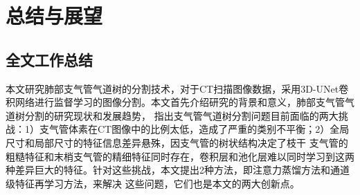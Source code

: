 
\chapter{总结与展望}\label{chap:summary_and_outlook}

\section{全文工作总结}

本文研究肺部支气管气道树的分割技术，对于CT扫描图像数据，采用3D-UNet卷积网络进行监督学习的图像分割。本文首先介绍研究的背景和意义，肺部支气管气道树分割的研究现状和发展趋势，
指出支气管气道树分割问题目前面临的两大挑战：1）支气管体素在CT图像中的比例太低，造成了严重的类别不平衡；2）全局尺寸和局部尺寸的特征信息差异悬殊，因支气管的树状结构决定了枝干
支气管的粗糙特征和末梢支气管的精细特征同时存在，卷积层和池化层难以同时学习到这两种差异巨大的特征。针对这些挑战，本文提出2种方法，即注意力蒸馏方法和通道级特征再学习方法，来解决
这些问题，它们也是本文的两大创新点。


